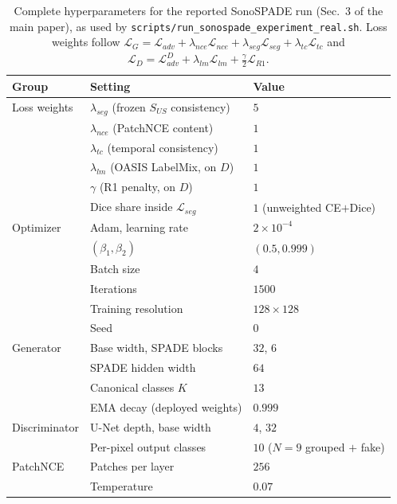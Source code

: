 \documentclass[runningheads]{llncs}
\begin{document}
\begin{table}[h]
\centering
\caption{Complete hyperparameters for the reported SonoSPADE run (Sec.~3 of the main paper), as used by
\texttt{scripts/run\_sonospade\_experiment\_real.sh}. Loss weights follow
$\mathcal{L}_G=\mathcal{L}_{adv}+\lambda_{nce}\mathcal{L}_{nce}+\lambda_{seg}\mathcal{L}_{seg}
+\lambda_{tc}\mathcal{L}_{tc}$ and
$\mathcal{L}_D=\mathcal{L}_{adv}^{D}+\lambda_{lm}\mathcal{L}_{lm}+\tfrac{\gamma}{2}\mathcal{L}_{R1}$.}
\label{tab:hyper}
\begin{tabular}{lll}
\toprule
Group & Setting & Value\\
\midrule
Loss weights & $\lambda_{seg}$ (frozen $S_{US}$ consistency) & $5$\\
             & $\lambda_{nce}$ (PatchNCE content) & $1$\\
             & $\lambda_{tc}$ (temporal consistency) & $1$\\
             & $\lambda_{lm}$ (OASIS LabelMix, on $D$) & $1$\\
             & $\gamma$ (R1 penalty, on $D$) & $1$\\
             & Dice share inside $\mathcal{L}_{seg}$ & $1$ (unweighted CE${+}$Dice)\\
\midrule
Optimizer    & Adam, learning rate & $2\times10^{-4}$\\
             & $(\beta_1,\beta_2)$ & $(0.5, 0.999)$\\
             & Batch size & $4$\\
             & Iterations & $1500$\\
             & Training resolution & $128\times128$\\
             & Seed & $0$\\
\midrule
Generator    & Base width, SPADE blocks & $32$, $6$\\
             & SPADE hidden width & $64$\\
             & Canonical classes $K$ & $13$\\
             & EMA decay (deployed weights) & $0.999$\\
\midrule
Discriminator& U-Net depth, base width & $4$, $32$\\
             & Per-pixel output classes & $10$ ($N{=}9$ grouped ${+}$ fake)\\
\midrule
PatchNCE     & Patches per layer & $256$\\
             & Temperature & $0.07$\\
\bottomrule
\end{tabular}
\end{table}
\end{document}
